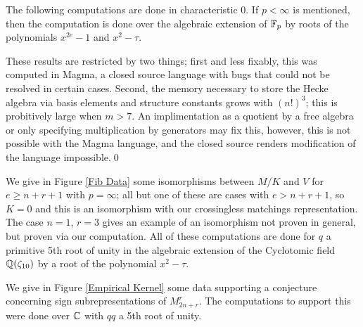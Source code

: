 \documentclass{amsart}
\begin{document}
The following computations are done in characteristic 0.
If $p < \infty$ is mentioned, then the computation is done over the algebraic extension of $\mathbb{F}_p$ by roots of the polynomials $x^{2e} - 1$ and $x^2 - \tau$.

\begin{remark}
  These results are restricted by two things; first and less fixably, this was computed in Magma, a closed source language with bugs that could not be resolved in certain cases.
  Second, the memory necessary to store the Hecke algebra via basis elements and structure constants grows with $(n!)^3$;
  this is probitively large when $m > 7$.
  An implimentation as a quotient by a free algebra or only specifying multiplication by generators may fix this, however, this is not possible with the Magma language, and the closed source renders modification of the language impossible.\qed
\end{remark}

We give in Figure \ref{Fib Data} some isomorphisms between $M/K$ and $V$ for $e \geq n + r + 1$ with $p = \infty$;
all but one of these are cases with $e > n + r + 1$, so $K=0$ and this is an isomorphism with our crossingless matchings representation.
The case $n = 1$, $r = 3$ gives an example of an isomorphism not proven in general, but proven via our computation.
All of these computations are done for $q$ a primitive 5th root of unity in the algebraic extension of the Cyclotomic field $\mathbb{Q}(\zeta_{10})$ by a root of the polynomial $x^2 - \tau$.

We give in Figure \ref{Empirical Kernel} some data supporting a conjecture concerning sign subrepresentations of $M_{2n + r}^r$.
The computations to support this were done over $\mathbb{C}$ with $qq$ a 5th root of unity.
\end{document}
